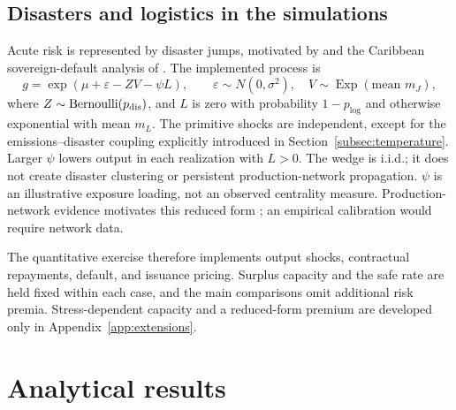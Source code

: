 \documentclass[11pt]{article}
\begin{document}
\subsection{Disasters and logistics in the simulations}
Acute risk is represented by disaster jumps, motivated by \textcite{Barro2006} and the Caribbean sovereign-default analysis of \textcite{Mallucci2022}. The implemented process is
\begin{equation}\label{eq:output}
 g=\exp(\mu+\varepsilon-ZV-\psi L),\qquad
 \varepsilon\sim N(0,\sigma^2),\quad V\sim\operatorname{Exp}(\text{mean }m_J),
\end{equation}
where $Z\sim\operatorname{Bernoulli}(p_{\rm dis})$, and $L$ is zero with probability $1-p_{\log}$ and otherwise exponential with mean $m_L$. The primitive shocks are independent, except for the emissions--disaster coupling explicitly introduced in Section~\ref{subsec:temperature}. Larger $\psi$ lowers output in each realization with $L>0$. The wedge is i.i.d.; it does not create disaster clustering or persistent production-network propagation. $\psi$ is an illustrative exposure loading, not an observed centrality measure. Production-network evidence motivates this reduced form \parencite{Carvalho2014,boehm2019_input_linkages}; an empirical calibration would require network data.

The quantitative exercise therefore implements output shocks, contractual repayments, default, and issuance pricing. Surplus capacity and the safe rate are held fixed within each case, and the main comparisons omit additional risk premia. Stress-dependent capacity and a reduced-form premium are developed only in Appendix~\ref{app:extensions}.

\section{Analytical results}\label{sec:theory}
\end{document}
